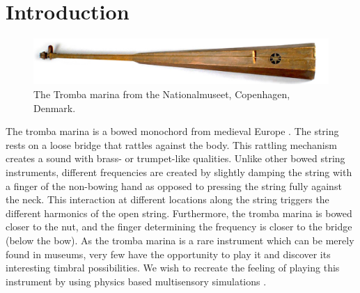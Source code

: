 \documentclass[dvipsnames, pdftex]{article}
\title{\papertitle}
\begin{document}
%
\capstartfalse
\maketitle
\capstarttrue
%
\begin{abstract}
In this paper we propose a multisensory simulation of a tromba marina - a bowed string instrument in virtual reality. The auditory feedback is generated by an accurate physical model, the haptic feedback is provided by the PHANTOM Omni, and the visual feedback is rendered through an Oculus Rift CV1 head-mounted display (HMD). Moreover, we present a user study exploring the experience of interacting with a virtual bowed string instrument, as well as evaluating the playability of the system. The study comprises of both qualitative (observations, think aloud and interviews) and quantitative (survey) data collection methods. The results indicate that the implementation was successful, offering participants realistic feedback, as well as a satisfactory multisensory experience, allowing them to use the system as a musical instrument.
\end{abstract}

\section{Introduction}\label{sec:introduction}

\begin{figure}[h]
    \centering
    \includegraphics[width=1.0\columnwidth]{SMC 2020 paper template LaTeX/figures/trombaHorizontal.jpg}
    \caption{The Tromba marina from the Nationalmuseet, Copenhagen, Denmark.}
    \label{fig:trombaHorizontal}
\end{figure}
The tromba marina is a bowed monochord from medieval Europe \cite{encyclopaedia2020}. The string rests on a loose bridge that rattles against the body. This rattling mechanism creates a sound with brass- or trumpet-like qualities. Unlike other bowed string instruments, different frequencies are created by slightly damping the string with a finger of the non-bowing hand as opposed to pressing the string fully against the neck. This interaction at different locations along the string triggers the different harmonics of the open string. Furthermore, the tromba marina is bowed closer to the nut, and the finger determining the frequency is closer to the bridge (below the bow).
As the tromba marina is a rare instrument which can be merely found in museums, very few have the opportunity to play it and discover its interesting timbral possibilities. 
We wish to recreate the feeling of playing this instrument by using physics based  multisensory simulations \cite{pai2005multisensory}.
\end{document}
